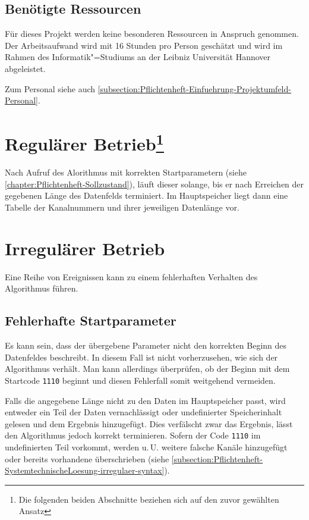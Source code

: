 \subsection{Benötigte Ressourcen}
Für dieses Projekt werden keine besonderen Ressourcen in Anspruch genommen. Der Arbeitsaufwand wird mit 16 Stunden pro Person geschätzt und wird im Rahmen des Informatik"=Studiums an der Leibniz Universität Hannover abgeleistet.

Zum Personal siehe auch \autoref{subsection:Pflichtenheft-Einfuehrung-Projektumfeld-Personal}.

\pagebreak

\section[Regulärer Betrieb]{Regulärer Betrieb\footnote{Die folgenden beiden Abschnitte beziehen sich auf den zuvor gewählten Ansatz}}
\label{section:Pflichtenheft-SystemtechnischeLoesung-regulaer}

Nach Aufruf des Alorithmus mit korrekten Startparametern (siehe \autoref{chapter:Pflichtenheft-Sollzustand}), läuft dieser solange, bis er nach Erreichen der gegebenen Länge des Datenfelds terminiert. Im Hauptspeicher liegt dann eine Tabelle der Kanalnummern und ihrer jeweiligen Datenlänge vor.


\section{Irregulärer Betrieb}
\label{section:Pflichtenheft-SystemtechnischeLoesung-irregulaer}

Eine Reihe von Ereignissen kann zu einem fehlerhaften Verhalten des Algorithmus führen.

\subsection{Fehlerhafte Startparameter}
\label{subsection:Pflichtenheft-SystemtechnischeLoesung-irregulaer-startparameter}

Es kann sein, dass der übergebene Parameter nicht den korrekten Beginn des Datenfeldes beschreibt. In diesem Fall ist nicht vorherzusehen, wie sich der Algorithmus verhält. Man kann allerdings überprüfen, ob der Beginn mit dem Startcode \texttt{1110} beginnt und diesen Fehlerfall somit weitgehend vermeiden.

Falls die angegebene Länge nicht zu den Daten im Hauptspeicher passt, wird entweder ein Teil der Daten vernachlässigt oder undefinierter Speicherinhalt gelesen und dem Ergebnis hinzugefügt. Dies verfälscht zwar das Ergebnis, lässt den Algorithmus jedoch korrekt terminieren. Sofern der Code \texttt{1110} im undefinierten Teil vorkommt, werden u.\,U. weitere falsche Kanäle hinzugefügt oder bereits vorhandene überschrieben (siehe \autoref{subsection:Pflichtenheft-SystemtechnischeLoesung-irregulaer-syntax}).

